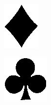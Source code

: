 \documentclass[times, zavrsni, numeric, utf8]{fer}
\begin{document}
\begin{figure}[H]
\begin{subfigure}[b]{0.14\textwidth}
					\caption{}
				\end{subfigure}
				\begin{subfigure}[b]{0.15\textwidth}
					\centering
					\includegraphics[width=\textwidth]{templates-rank/image31.png}
					\caption{}
				\end{subfigure}
				\begin{subfigure}[b]{0.15\textwidth}
					\centering
					\includegraphics[width=\textwidth]{templates-rank/image30.png}

\end{subfigure}
\end{figure}
\end{document}
